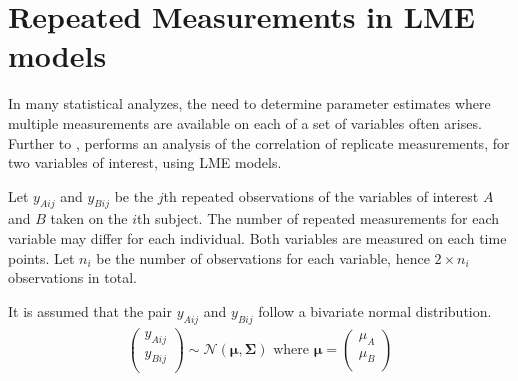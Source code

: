 \documentclass[12pt, a4paper]{report}
\theoremstyle{plain}
\theoremstyle{definition}
\theoremstyle{remark}
\begin{document}
			
%	
	
	
	
	

		\section{Repeated Measurements in LME models}
		
		In many statistical analyzes, the need to determine parameter estimates where multiple measurements are available on each of a set of variables often arises. Further to \citet{lam}, \citet{hamlett} performs an analysis of the correlation of replicate measurements, for two variables of interest, using LME models.
		
		Let $y_{Aij}$ and $y_{Bij}$ be the $j$th repeated observations of the variables of interest $A$ and $B$ taken on the $i$th subject. The number of repeated measurements for each variable may differ for each individual.
		Both variables are measured on each time points. Let $n_{i}$ be the number of observations for each variable, hence $2\times n_{i}$ observations in total.
		
		It is assumed that the pair $y_{Aij}$ and $y_{Bij}$ follow a bivariate normal distribution.
		\begin{eqnarray*}
			\left(
			\begin{array}{c}
				y_{Aij} \\
				y_{Bij} \\
			\end{array}
			\right) \sim \mathcal{N}(
			\boldsymbol{\mu}, \boldsymbol{\Sigma})\mbox{   where } \boldsymbol{\mu} = \left(
			\begin{array}{c}
				\mu_{A} \\
				\mu_{B} \\
			\end{array}
			\right)
		\end{eqnarray*}
		
\end{document}
